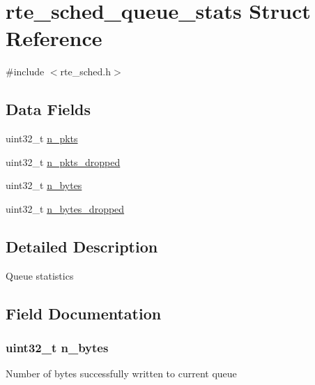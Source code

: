 \hypertarget{structrte__sched__queue__stats}{}\section{rte\+\_\+sched\+\_\+queue\+\_\+stats Struct Reference}
\label{structrte__sched__queue__stats}


{\ttfamily \#include $<$rte\+\_\+sched.\+h$>$}

\subsection*{Data Fields}
\begin{DoxyCompactItemize}
\item 
uint32\+\_\+t \hyperlink{structrte__sched__queue__stats_aa1106014beffd6c6e35b34df746f0107}{n\+\_\+pkts}
\item 
uint32\+\_\+t \hyperlink{structrte__sched__queue__stats_af527163bc22071756741d82093242f0a}{n\+\_\+pkts\+\_\+dropped}
\item 
uint32\+\_\+t \hyperlink{structrte__sched__queue__stats_a548c1a1ede34d8ceb9009e1d52b63228}{n\+\_\+bytes}
\item 
uint32\+\_\+t \hyperlink{structrte__sched__queue__stats_a0db788b42c5d8e3d91004c334d99b3c7}{n\+\_\+bytes\+\_\+dropped}
\end{DoxyCompactItemize}


\subsection{Detailed Description}
Queue statistics 

\subsection{Field Documentation}
\hypertarget{structrte__sched__queue__stats_a548c1a1ede34d8ceb9009e1d52b63228}{}
\subsubsection[{n\+\_\+bytes}]{\setlength{\rightskip}{0pt plus 5cm}uint32\+\_\+t n\+\_\+bytes}\label{structrte__sched__queue__stats_a548c1a1ede34d8ceb9009e1d52b63228}
Number of bytes successfully written to current queue \hypertarget{structrte__sched__queue__stats_a0db788b42c5d8e3d91004c334d99b3c7}{}
